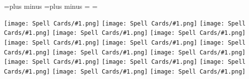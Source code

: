 \documentclass{article}
\newcommand\card[1]{{\texttt{[image: Spell Cards/\#1.png]}}}
\renewcommand\card[1]{{\texttt{[image: Spell Cards/\#1.png]}}}
\renewcommand\card[1]{{\texttt{[image: Spell Cards/\#1.png]}}}
\newcommand\nospaces{%
  \spaceskip=\myspace plus \myspace minus \myspace
  \xspaceskip=\myspace plus \myspace minus \myspace
  \baselineskip=\myspace
  \lineskip=\myspace
}
\begin{document}
\raggedright






\nospaces

\card{Bane}
\card{Bless}
\card{Burning Hands}
\card{Cure Wounds}
\card{Fire Bolt}
\card{Guiding Bolt}
\card{Inflict Wounds}
\card{Light}
\card{Magic Missile}
\card{Ray of Frost}
\card{Sacred Flame}
\card{Shield}
\card{Shocking Grasp}
\card{Spare the Dying}
\card{Thunderwave}
\begin{minipage}[t]{0.22\hsize}
%
%
\end{minipage}





\end{document}
